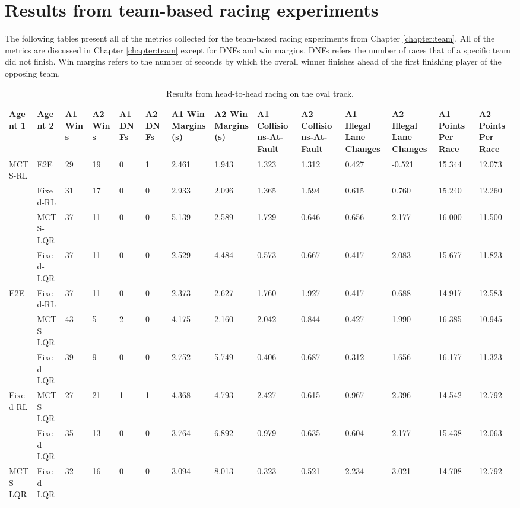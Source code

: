 \chapter{Results from team-based racing experiments} \label{app:team_results}
The following tables present all of the metrics collected for the team-based racing experiments from Chapter \ref{chapter:team}. All of the metrics are discussed in Chapter \ref{chapter:team} except for DNFs and win margins. DNFs refers the number of races that of a specific team did not finish. Win margins refers to the number of seconds by which the overall winner finishes ahead of the first finishing player of the opposing team.
\begin{table} [H]
\centering
\begin{adjustbox}{width=\textwidth}
\begin{tabular}{llp{1.1cm}p{1.1cm}p{1.1cm}p{1.1cm}p{1.5cm}p{1.5cm}p{1.5cm}p{1.5cm}p{1.5cm}p{1.5cm}p{1.1cm}p{1.1cm}}
    \toprule
        Agent 1 & Agent 2 & A1 Wins & A2 Wins & A1 DNFs & A2 DNFs & A1 Win Margins (\si{\second}) & A2 Win Margins (\si{\second}) & A1 Collisions-At-Fault & A2 Collisions-At-Fault & A1 Illegal Lane Changes & A2 Illegal Lane Changes & A1 Points Per Race & A2 Points Per Race \\ \hline
        MCTS-RL & E2E & 29 & 19 & 0 & 1 & 2.461 & 1.943& 1.323 & 1.312 & 0.427 & -0.521 & 15.344 & 12.073\\ 
        ~ & Fixed-RL & 31 & 17 & 0 & 0 & 2.933 & 2.096 & 1.365 & 1.594 & 0.615 & 0.760 & 15.240 & 12.260 \\ 
        ~ & MCTS-LQR & 37 & 11 & 0 & 0 & 5.139 & 2.589 & 1.729 & 0.646 & 0.656 & 2.177 & 16.000 & 11.500 \\ 
        ~ & Fixed-LQR & 37 & 11 & 0 & 0 & 2.529 & 4.484 & 0.573 & 0.667 & 0.417 & 2.083 & 15.677 & 11.823 \\ \hline
        E2E & Fixed-RL & 37 & 11 & 0 & 0 & 2.373 & 2.627 & 1.760 & 1.927 & 0.417 & 0.688 & 14.917 & 12.583\\ 
        ~ & MCTS-LQR & 43 & 5 & 2 & 0 & 4.175 & 2.160 & 2.042 & 0.844 & 0.427 & 1.990 & 16.385 & 10.945 \\ 
        ~ & Fixed-LQR & 39 & 9 & 0 & 0 & 2.752 & 5.749 & 0.406 & 0.687 & 0.312 & 1.656 & 16.177 & 11.323 \\ \hline
        Fixed-RL & MCTS-LQR & 27 & 21 & 1 & 1 & 4.368 & 4.793 & 2.427 & 0.615 & 0.967 & 2.396 & 14.542 & 12.792 \\ 
        ~ & Fixed-LQR & 35 & 13 & 0 & 0 & 3.764 & 6.892 & 0.979 & 0.635 & 0.604 & 2.177 & 15.438 & 12.063 \\ \hline
        MCTS-LQR & Fixed-LQR & 32 & 16 & 0 & 0 & 3.094 & 8.013 & 0.323 & 0.521 & 2.234 & 3.021 & 14.708 & 12.792 \\ \bottomrule
\end{tabular}
\end{adjustbox}
\vspace{1 mm}
\caption{Results from head-to-head racing on the oval track.}
 \label{tab:team_results_oval}
\end{table}
